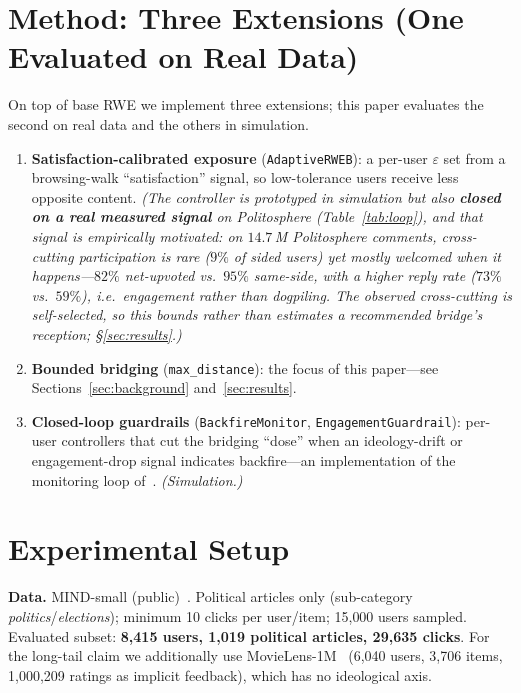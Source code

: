 \documentclass[sigconf,nonacm]{acmart}
\begin{document}
\section{Method: Three Extensions (One Evaluated on Real Data)}
\label{sec:method}
On top of base RWE we implement three extensions; this paper evaluates the second
on real data and the others in simulation.
\begin{enumerate}
  \item \textbf{Satisfaction-calibrated exposure} (\texttt{AdaptiveRWEB}): a
  per-user $\varepsilon$ set from a browsing-walk ``satisfaction'' signal, so
  low-tolerance users receive less opposite content. \emph{(The controller is
  prototyped in simulation but also \textbf{closed on a real measured signal} on
  Politosphere (Table~\ref{tab:loop}), and that signal is empirically motivated: on $14.7$\,M Politosphere
  comments, cross-cutting participation is rare ($9\%$ of sided users) yet mostly
  welcomed when it happens---$82\%$ net-upvoted vs.\ $95\%$ same-side, with a
  \emph{higher} reply rate ($73\%$ vs.\ $59\%$), i.e.\ engagement rather than
  dogpiling. The observed cross-cutting is self-selected, so this bounds rather than
  estimates a recommended bridge's reception; \S\ref{sec:results}.)}
  \item \textbf{Bounded bridging} (\texttt{max\_distance}): the focus of this
  paper---see Sections~\ref{sec:background} and~\ref{sec:results}.
  \item \textbf{Closed-loop guardrails} (\texttt{BackfireMonitor},
  \texttt{EngagementGuardrail}): per-user controllers that cut the bridging
  ``dose'' when an ideology-drift or engagement-drop signal indicates backfire---an
  implementation of the monitoring loop of~\cite{stray2021designing}.
  \emph{(Simulation.)}
\end{enumerate}

\section{Experimental Setup}
\label{sec:setup}
\textbf{Data.} MIND-small (public)~\cite{wu2020mind}. Political articles only
(sub-category \emph{politics}/\emph{elections}); minimum 10 clicks per user/item;
15{,}000 users sampled. Evaluated subset: \textbf{8{,}415 users, 1{,}019 political
articles, 29{,}635 clicks}. For the long-tail claim we additionally use
MovieLens-1M~\cite{harper2015movielens} (6{,}040 users, 3{,}706 items, 1{,}000{,}209
ratings as implicit feedback), which has no ideological axis.
\end{document}
